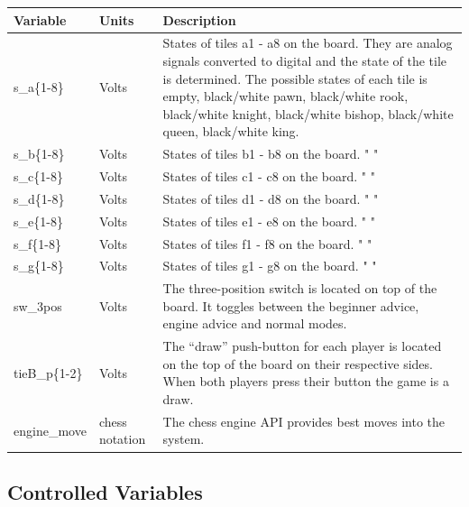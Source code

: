 \documentclass[12pt]{article}
\begin{document}
{\begin{table}[H]
  \centering
      \setlength{\leftmargini}{0.4cm}
      \begin{tabular}{| >{\centering\arraybackslash}m{2.5cm} | 
        >{\centering\arraybackslash}m{2cm} | 
        >{\centering\arraybackslash}m{9cm} |}
      \hline
      \rowcolor[gray]{0.9}
      Variable & Units & Description\\
      \hline
      s\_a\{1-8\} & Volts & States of tiles a1 - a8 on the board. They are analog signals 
      converted to digital and the state of the tile is determined. The possible states of 
      each tile is empty, black/white pawn, black/white rook, black/white knight, 
      black/white bishop, black/white queen, black/white king. \\
      \hline
      s\_b\{1-8\} & Volts & States of tiles b1 - b8 on the board. " " \\
      \hline
      s\_c\{1-8\} & Volts & States of tiles c1 - c8 on the board. " " \\
      \hline
      s\_d\{1-8\} & Volts & States of tiles d1 - d8 on the board. " " \\
      \hline
      s\_e\{1-8\} & Volts & States of tiles e1 - e8 on the board. " " \\
      \hline
      s\_f\{1-8\} & Volts & States of tiles f1 - f8 on the board. " " \\
      \hline
      s\_g\{1-8\} & Volts & States of tiles g1 - g8 on the board. " " \\
      \hline
      sw\_3pos & Volts & The three-position switch is located
      on top of the board. It toggles between the beginner 
      advice, engine advice and normal modes.\\
      \hline
      tieB\_p\{1-2\} & Volts & The ``draw'' push-button for each player is located on 
      the top of the board on their respective sides. When both players press their button
      the game is a draw. \\
      \hline
      engine\_move & chess notation & The chess engine API provides best moves into 
      the system. \\
      \hline 
      \end{tabular}
  \label{Table}
  \end{table}

\subsection{Controlled Variables}

}
\end{document}
